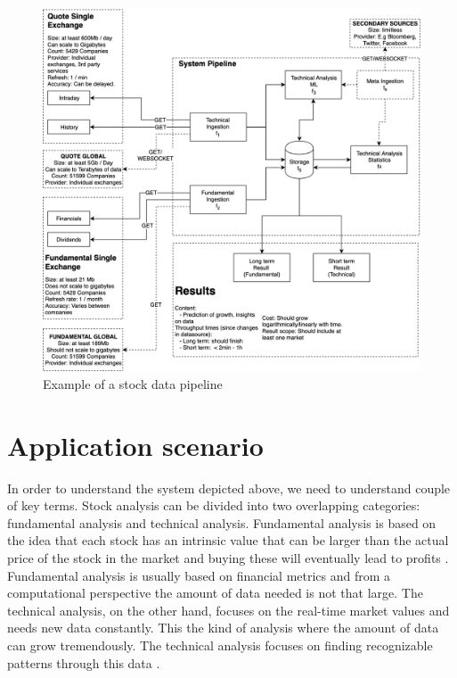 
\begin{figure}[ht]
    \includegraphics[scale=0.26]{images/system2} 
    \centering
    \caption{Example of a stock data pipeline}
\end{figure}

\section{Application scenario}

In order to understand the system depicted above, we need to understand couple of key terms.
Stock analysis can be divided into two overlapping categories: fundamental analysis and technical analysis.
Fundamental analysis is based on the idea that each stock has an intrinsic value that can be larger than the actual price of the stock in the market and buying these will eventually lead to profits \cite{sohnke}.
Fundamental analysis is usually based on financial metrics and from a computational perspective the amount of data needed is not that large.
The technical analysis, on the other hand, focuses on the real-time market values and needs new data constantly.
This the kind of analysis where the amount of data can grow tremendously.
The technical analysis focuses on finding recognizable patterns through this data \cite{murphy}.


